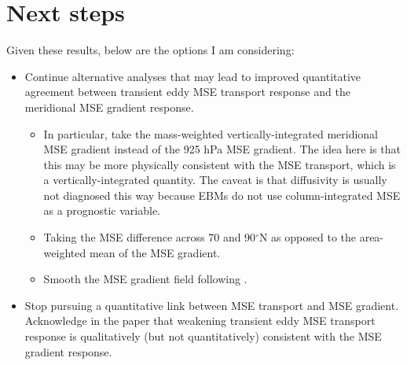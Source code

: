 \documentclass{article}
\begin{document}
\section*{Next steps}
Given these results, below are the options I am considering:
\begin{itemize}
    \item Continue alternative analyses that may lead to improved quantitative agreement between transient eddy MSE transport response and the meridional MSE gradient response.
        \begin{itemize}
            \item In particular, take the mass-weighted vertically-integrated meridional MSE gradient instead of the 925 hPa MSE gradient. The idea here is that this may be more physically consistent with the MSE transport, which is a vertically-integrated quantity. The caveat is that diffusivity is usually not diagnosed this way because EBMs do not use column-integrated MSE as a prognostic variable.
            \item Taking the MSE difference across 70 and 90$^\circ$N as opposed to the area-weighted mean of the MSE gradient.
            \item Smooth the MSE gradient field following \cite{sardeshmukh1984}.
        \end{itemize}
    \item Stop pursuing a quantitative link between MSE transport and MSE gradient. Acknowledge in the paper that weakening transient eddy MSE transport response is qualitatively (but not quantitatively) consistent with the MSE gradient response.
\end{itemize}



\end{document}
